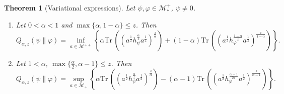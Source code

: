 \documentclass[12pt]{article}
\newtheorem{theorem}{Theorem}[section]
\theoremstyle{definition}
\theoremstyle{remark}
\numberwithin{equation}{section}
\def\Me{\mathcal M}
\def \Tr{\mathrm{Tr}\,}
\begin{document}
\begin{theorem}[Variational expressions]\label{thm:variational} Let $\psi,\varphi\in \Me_*^+$, $\psi\ne 0$. 
\begin{enumerate}
\item[(i)] Let $0<\alpha<1$ and $\max\{\alpha,1-\alpha\}\le z$. Then
\[
Q_{\alpha,z}(\psi\|\varphi)=\inf_{a\in \Me^{++}}\left\{\alpha
\Tr\left((a^{\frac12}h_\psi^{\frac{\alpha}{z}}a^{\frac12})^{\frac{z}{\alpha}}\right)+(1-\alpha)
\Tr\left((a^{\frac12}h_\varphi^{\frac{1-\alpha}{z}}a^{\frac12})^{\frac{z}{1-\alpha}}\right) \right\}.
\]

\item[(ii)] Let $1<\alpha$, $\max\{\frac{\alpha}{2},\alpha-1\}\le z$. Then
\[
Q_{\alpha,z}(\psi\|\varphi)=\sup_{a\in \Me_+} \left\{\alpha
\Tr\left((a^{\frac12}h_\psi^{\frac{\alpha}{z}}a^{\frac12})^{\frac{z}{\alpha}}\right)-(\alpha-1)
\Tr\left((a^{\frac12}h_\varphi^{\frac{\alpha-1}{2z}}a^{\frac12})^{\frac{z}{\alpha-1}}\right) \right\}.
\]

\end{enumerate}


\end{theorem}
\end{document}
